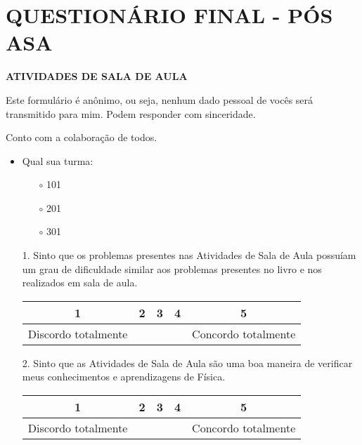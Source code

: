 \chapter{QUESTIONÁRIO FINAL - PÓS ASA} \label{ch:questASA}

\begin{center}
    \textbf{ATIVIDADES DE SALA DE AULA}
\end{center}

Este formulário é anônimo, ou seja, nenhum dado pessoal de vocês será transmitido para mim. Podem responder com sinceridade.

Conto com a colaboração de todos.

\begin{itemize}
    \item Qual sua turma:
    \begin{itemize}
        \item[$\circ$] 101
        \item[$\circ$] 201
        \item[$\circ$] 301
        
    \end{itemize}

    \item[1.] Sinto que os problemas presentes nas Atividades de Sala de Aula possuíam um grau de dificuldade similar aos problemas presentes no livro e nos realizados em sala de aula. \label{item:qasa1}
    \vspace{0.75cm}
    
    \begin{minipage}{\linewidth}
    \centering
    \begin{tabular}{|c|c|c|c|c|}
    \hline
    \textbf{1} & \textbf{2} & \textbf{3} & \textbf{4} & \textbf{5} \\
    \hline
    Discordo totalmente & \phantom{aaaaaaaa} & \phantom{aaaaaaaa} & \phantom{aaaaaaaa} & Concordo totalmente \\
    \hline
    \end{tabular}
    \end{minipage}
 
    \item[2.] Sinto que as Atividades de Sala de Aula são uma boa maneira de verificar meus conhecimentos e aprendizagens de Física.
    \vspace{0.75cm}
    
    \begin{minipage}{\linewidth}
    \centering
    \begin{tabular}{|c|c|c|c|c|}
    \hline
    \textbf{1} & \textbf{2} & \textbf{3} & \textbf{4} & \textbf{5} \\
    \hline
    Discordo totalmente & \phantom{aaaaaaaa} & \phantom{aaaaaaaa} & \phantom{aaaaaaaa} & Concordo totalmente \\
    \hline
    \end{tabular}
    \end{minipage}


\end{itemize}
